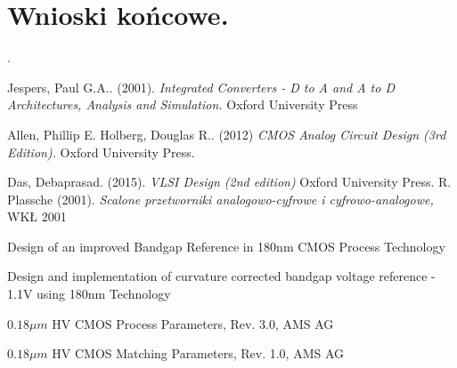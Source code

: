 \documentclass[10pt,a4paper]{report}
\begin{document}
	\section{Wnioski końcowe.}	

	
	\appendix
.
	\begin{thebibliography}{9}
		Jespers, Paul G.A.. (2001). 
		\textit{Integrated Converters - D to A and A to D Architectures, Analysis and Simulation.}
		Oxford University Press
		
		Allen, Phillip E. Holberg, Douglas R.. (2012)  
		\textit{CMOS Analog Circuit Design (3rd Edition). }
		Oxford University Press.
		
		Das, Debaprasad. (2015).
		\textit{VLSI Design (2nd edition)}
		Oxford University Press.
		R. Plassche (2001). 
		\textit{Scalone przetworniki analogowo-cyfrowe i cyfrowo-analogowe,}
		WKŁ 2001
		
		Design of an improved Bandgap Reference in
		180nm CMOS Process Technology

		Design and implementation of curvature corrected
		bandgap voltage reference - 1.1V using 180nm Technology

		$0.18\mu m$ HV CMOS Process Parameters, Rev. 3.0, AMS AG

		$0.18\mu m$ HV CMOS Matching Parameters, Rev. 1.0, AMS AG
		
	\end{thebibliography}
\end{document}
